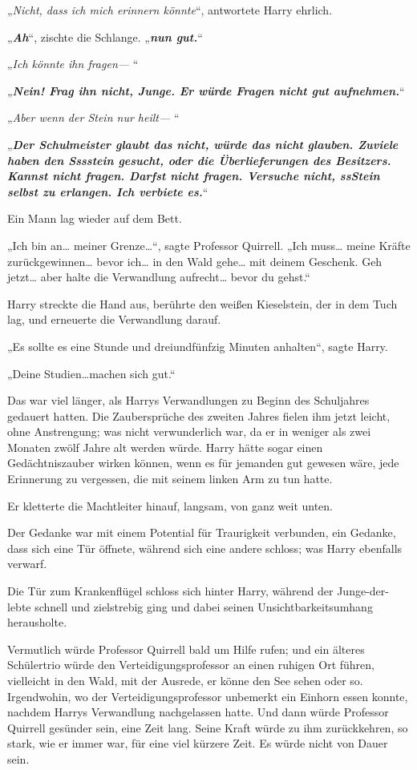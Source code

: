 {„\emph{Nicht, dass ich mich erinnern könnte}“, antwortete Harry ehrlich.

„\textbf{\emph{Ah}}“, zischte die Schlange. „\textbf{\emph{nun gut.}}“

„\emph{Ich könnte ihn fragen—} “

„\textbf{\emph{Nein! Frag ihn nicht, Junge. Er würde Fragen nicht gut aufnehmen.}}“

„\emph{Aber wenn der Stein nur heilt—} “

„\textbf{\emph{Der Schulmeister glaubt das nicht, würde das nicht glauben. Zuviele haben den Sssstein gesucht, oder die Überlieferungen des Besitzers. Kannst nicht fragen. Darfst nicht fragen. Versuche nicht, ssStein selbst zu erlangen. Ich verbiete es.}}“

Ein Mann lag wieder auf dem Bett.

„Ich bin an… meiner Grenze…“, sagte Professor Quirrell. „Ich muss… meine Kräfte zurückgewinnen… bevor ich… in den Wald gehe… mit deinem Geschenk. Geh jetzt… aber halte die Verwandlung aufrecht… bevor du gehst.“

Harry streckte die Hand aus, berührte den weißen Kieselstein, der in dem Tuch lag, und erneuerte die Verwandlung darauf.

„Es sollte es eine Stunde und dreiundfünfzig Minuten anhalten“, sagte Harry.

„Deine Studien…machen sich gut.“

Das war viel länger, als Harrys Verwandlungen zu Beginn des Schuljahres gedauert hatten. Die Zaubersprüche des zweiten Jahres fielen ihm jetzt leicht, ohne Anstrengung; was nicht verwunderlich war, da er in weniger als zwei Monaten zwölf Jahre alt werden würde. Harry hätte sogar einen Gedächtniszauber wirken können, wenn es für jemanden gut gewesen wäre, jede Erinnerung zu vergessen, die mit seinem linken Arm zu tun hatte.

Er kletterte die Machtleiter hinauf, langsam, von ganz weit unten.

Der Gedanke war mit einem Potential für Traurigkeit verbunden, ein Gedanke, dass sich eine Tür öffnete, während sich eine andere schloss; was Harry ebenfalls verwarf.

Die Tür zum Krankenflügel schloss sich hinter Harry, während der Junge-der-lebte schnell und zielstrebig ging und dabei seinen Unsichtbarkeitsumhang herausholte.

Vermutlich würde Professor Quirrell bald um Hilfe rufen; und ein älteres Schülertrio würde den Verteidigungsprofessor an einen ruhigen Ort führen, vielleicht in den Wald, mit der Ausrede, er könne den See sehen oder so. Irgendwohin, wo der Verteidigungsprofessor unbemerkt ein Einhorn essen konnte, nachdem Harrys Verwandlung nachgelassen hatte. Und dann würde Professor Quirrell gesünder sein, eine Zeit lang. Seine Kraft würde zu ihm zurückkehren, so stark, wie er immer war, für eine viel kürzere Zeit. Es würde nicht von Dauer sein.

}
